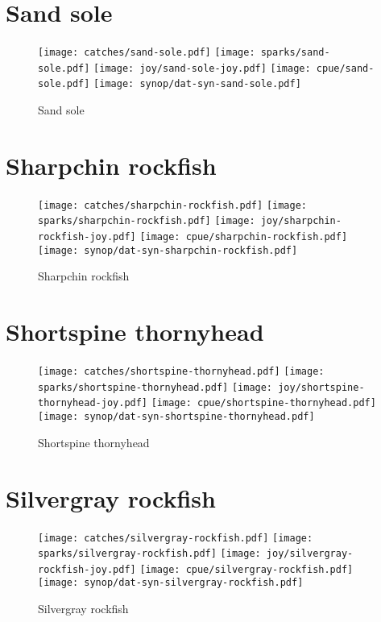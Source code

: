 \section*{Sand sole}

\begin{figure}[htbp]
\centering
\texttt{[image: catches/sand-sole.pdf]}
\texttt{[image: sparks/sand-sole.pdf]}
\texttt{[image: joy/sand-sole-joy.pdf]}
\texttt{[image: cpue/sand-sole.pdf]}
\texttt{[image: synop/dat-syn-sand-sole.pdf]}
\caption{Sand sole}
\end{figure}
\clearpage
\section*{Sharpchin rockfish}

\begin{figure}[htbp]
\centering
\texttt{[image: catches/sharpchin-rockfish.pdf]}
\texttt{[image: sparks/sharpchin-rockfish.pdf]}
\texttt{[image: joy/sharpchin-rockfish-joy.pdf]}
\texttt{[image: cpue/sharpchin-rockfish.pdf]}
\texttt{[image: synop/dat-syn-sharpchin-rockfish.pdf]}
\caption{Sharpchin rockfish}
\end{figure}
\clearpage
\section*{Shortspine thornyhead}

\begin{figure}[htbp]
\centering
\texttt{[image: catches/shortspine-thornyhead.pdf]}
\texttt{[image: sparks/shortspine-thornyhead.pdf]}
\texttt{[image: joy/shortspine-thornyhead-joy.pdf]}
\texttt{[image: cpue/shortspine-thornyhead.pdf]}
\texttt{[image: synop/dat-syn-shortspine-thornyhead.pdf]}
\caption{Shortspine thornyhead}
\end{figure}
\clearpage
\section*{Silvergray rockfish}

\begin{figure}[htbp]
\centering
\texttt{[image: catches/silvergray-rockfish.pdf]}
\texttt{[image: sparks/silvergray-rockfish.pdf]}
\texttt{[image: joy/silvergray-rockfish-joy.pdf]}
\texttt{[image: cpue/silvergray-rockfish.pdf]}
\texttt{[image: synop/dat-syn-silvergray-rockfish.pdf]}
\caption{Silvergray rockfish}
\end{figure}
\clearpage

